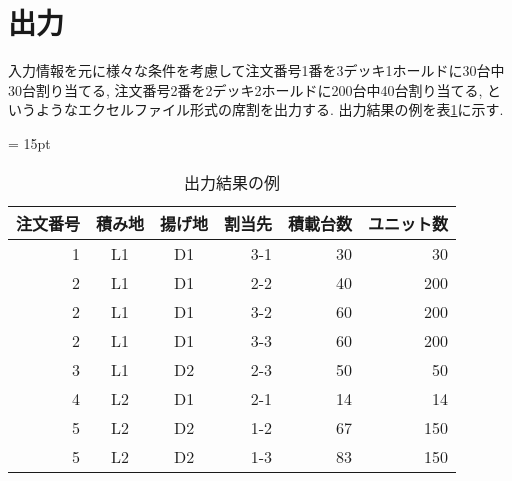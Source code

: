 
\newpage

\section{出力}
入力情報を元に様々な条件を考慮して注文番号1番を3デッキ1ホールドに30台中30台割り当てる, 注文番号2番を2デッキ2ホールドに200台中40台割り当てる, というようなエクセルファイル形式の席割を出力する. 出力結果の例を表\ref{table23}に示す. \\

\begin{table}[htbp]
\centering
\tabcolsep = 15pt
\renewcommand{\arraystretch}{0.8}
\caption{出力結果の例}
\label{table23}
\begin{center}
\begin{tabular}{rccrrr} \hline
注文番号 & 積み地 & 揚げ地 & 割当先 & 積載台数 & ユニット数 \\ \hline
1 & L1 & D1 & 3-1 & 30 & 30 \\
2 & L1 & D1 & 2-2 & 40 & 200 \\
2 & L1 & D1 & 3-2 & 60 & 200 \\
2 & L1 & D1 & 3-3 & 60 & 200 \\
3 & L1 & D2 & 2-3 & 50 & 50 \\
4 & L2 & D1 & 2-1 & 14 & 14 \\
5 & L2 & D2 & 1-2 & 67 & 150 \\
5 & L2 & D2 & 1-3 & 83 & 150 \\
\hline
\end{tabular}
\end{center}
\end{table}

